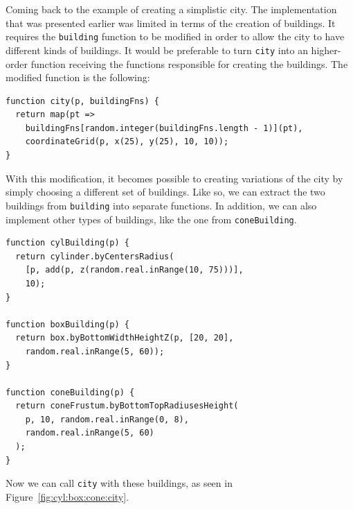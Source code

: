 Coming back to the example of creating a simplistic city.
The implementation that was presented earlier was limited in terms of the creation of buildings.
It requires the {\tt building} function to be modified in order to allow the city to have different kinds of buildings.
It would be preferable to turn {\tt city} into an higher-order function receiving the functions responsible for creating the buildings.
The modified function is the following:

\begin{verbatim}
function city(p, buildingFns) {
  return map(pt =>
    buildingFns[random.integer(buildingFns.length - 1)](pt),
    coordinateGrid(p, x(25), y(25), 10, 10));
}
\end{verbatim}

With this modification, it becomes possible to creating variations of the city by simply choosing a different set of buildings.
Like so, we can extract the two buildings from {\tt building} into separate functions.
In addition, we can also implement other types of buildings, like the one from {\tt coneBuilding}.

\begin{verbatim}
function cylBuilding(p) {
  return cylinder.byCentersRadius(
    [p, add(p, z(random.real.inRange(10, 75)))],
    10);
}

function boxBuilding(p) {
  return box.byBottomWidthHeightZ(p, [20, 20],
    random.real.inRange(5, 60));
}

function coneBuilding(p) {
  return coneFrustum.byBottomTopRadiusesHeight(
    p, 10, random.real.inRange(0, 8),
    random.real.inRange(5, 60)
  );
}
\end{verbatim}

Now we can call {\tt city} with these buildings, as seen in Figure~\ref{fig:cyl:box:cone:city}.


